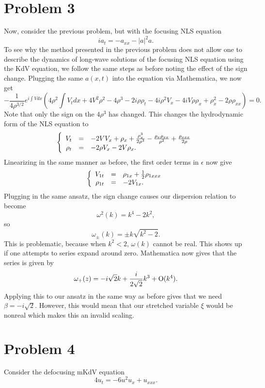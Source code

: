 \documentclass{article}
\begin{document}
\section{Problem 3}
Now, consider the previous problem, but with the focusing NLS equation
\[
i a_t=-a_{xx}-|a|^2 a.
\]
To see why the method presented in the previous problem does not allow one to describe the dynamics of long-wave solutions of the focusing NLS equation using the KdV equation, we follow the same steps as before noting the effect of the sign change. Plugging the same $a(x,t)$ into the equation via Mathematica, we now get 
\[
-\frac{1}{4\rho^{3/2}}e^{i \int Vdx}\left(4\rho^2\int V_tdx+4V^2\rho^2-4\rho^3-2i\rho\rho_t-4i\rho^2V_x-4iV\rho\rho_x+\rho_x^2-2\rho\rho_{xx}\right)=0.
\]
Note that only the sign on the $4\rho^3$ has changed. This changes the hydrodynamic form of the NLS equation to
\[
\left\{\begin{array}{rcl}
	\displaystyle V_t&=&-2VV_x+\rho_x+\frac{\rho_x^3}{2\rho^3}-\frac{\rho_x\rho_{xx}}{\rho^2}+\frac{\rho_{xxx}}{2\rho}\\
	\displaystyle \rho_t&=&\displaystyle -2\rho V_x-2V\rho_x.
\end{array}\right.
\]
Linearizing in the same manner as before, the first order terms in $\epsilon$ now give
\[
\left\{\begin{array}{rcl}
	\displaystyle V_{1t}&=&\rho_{1x}+\mbox{$\frac{1}{2}$}\rho_{1xxx}\\
	\displaystyle \rho_{1t}&=&\displaystyle -2 V_{1x}.
\end{array}\right.
\]
Plugging in the same ansatz, the sign change causes our dispersion relation to become
\[
\omega^2(k)=k^4-2k^2,
\]
so 
\[
\omega_\pm(k)=\pm k\sqrt{k^2-2}.
\]
This is problematic, because when $k^2<2$, $\omega(k)$ cannot be real. This shows up if one attempts to series expand around zero. Mathematica now gives that the series is given by
\[
\omega_+(z)=-i\sqrt{2}k+\frac{i}{2\sqrt{2}}k^3+\operatorname{O}(k^4).
\]
Applying this to our ansatz in the same way as before gives that we need $\beta=-i\sqrt{2}$. However, this would mean that our stretched variable $\xi$ would be nonreal which makes this an invalid scaling. 
\section{Problem 4}
Consider the defocusing mKdV equation
    \[
4u_t=-6u^2 u_x+u_{xxx}.
\]
\end{document}
